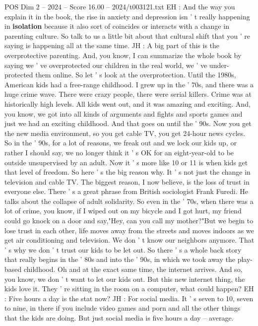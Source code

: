 \begin{textsample}{POS Dim 2 – 2024 – Score 16.00 – 2024/t003121.txt}
EH : And the way you explain it in the book, the rise in anxiety and depression isn ' t really happening in \textbf{isolation} because it also sort of coincides or interacts with a change in parenting culture.
So talk to us a little bit about that cultural shift that you ' re saying is happening all at the same time.
JH : A big part of this is the overprotective parenting.
And, you know, I can summarize the whole book by saying we ' ve overprotected our children in the real world, we ' ve under-protected them online.
So let ' s look at the overprotection.
Until the 1980s, American kids had a free-range childhood.
I grew up in the ' 70s, and there was a huge crime wave.
There were crazy people, there were serial killers.
Crime was at historically high levels.
All kids went out, and it was amazing and exciting.
And, you know, we got into all kinds of arguments and fights and sports games and just we had an exciting childhood.
And that goes on until the ' 90s.
Now you get the new media environment, so you get cable TV, you get 24-hour news cycles.
So in the ' 90s, for a lot of reasons, we freak out and we lock our kids up, or rather I should say, we no longer think it ' s OK for an eight-year-old to be outside unsupervised by an adult.
Now it ' s more like 10 or 11 is when kids get that level of freedom.
So here ' s the big reason why.
It ' s not just the change in television and cable TV.
The biggest reason, I now believe, is the loss of trust in everyone else.
There ' s a great phrase from British sociologist Frank Furedi.
He talks about the collapse of adult solidarity.
So even in the ' 70s, when there was a lot of crime, you know, if I wiped out on my bicycle and I got hurt, my friend could go knock on a door and say,"Hey, can you call my mother?"But we begin to lose trust in each other, life moves away from the streets and moves indoors as we get air conditioning and television.
We don ' t know our neighbors anymore.
That ' s why we don ' t trust our kids to be let out.
So there ' s a whole back story that really begins in the ' 80s and into the ' 90s, in which we took away the play-based childhood.
Oh and at the exact same time, the internet arrives.
And so, you know, we don ' t want to let our kids out.
But this new internet thing, the kids love it.
They ' re sitting in the room on a computer, what could happen?
EH : Five hours a day is the stat now?
JH : For social media.
It ' s seven to 10, seven to nine, in there if you include video games and porn and all the other things that the kids are doing.
But just social media is five hours a day -- average.

\end{textsample}
